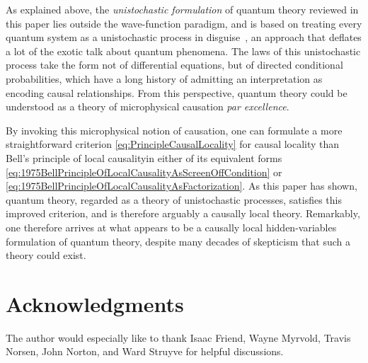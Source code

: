 \documentclass[12pt,english,prl,superscriptaddress,nobibnotes,nofootinbib]{revtex4-2}
\begin{document}
As explained above, the \emph{unistochastic formulation} of quantum
theory reviewed in this paper lies outside the wave-function paradigm,
and is based on treating every quantum system as a unistochastic process
in disguise~\citep{Barandes:2023tsqc,Barandes:2023tsqt}, an approach
that deflates a lot of the exotic talk about quantum phenomena. The
laws of this unistochastic process take the form not of differential
equations, but of directed conditional probabilities, which have a
long history of admitting an interpretation as encoding causal relationships.
From this perspective, quantum theory could be understood as a theory
of microphysical causation \emph{par excellence}.

By invoking this microphysical notion of causation, one can formulate
a more straightforward criterion \eqref{eq:PrincipleCausalLocality}
for causal locality than Bell's principle of local causality\textemdash in
either of its equivalent forms \eqref{eq:1975BellPrincipleOfLocalCausalityAsScreenOffCondition}
or \eqref{eq:1975BellPrincipleOfLocalCausalityAsFactorization}. As
this paper has shown, quantum theory, regarded as a theory of unistochastic
processes, satisfies this improved criterion, and is therefore arguably
a causally local theory. Remarkably, one therefore arrives at what
appears to be a causally local hidden-variables formulation of quantum
theory, despite many decades of skepticism that such a theory could
exist.

\section*{Acknowledgments}

The author would especially like to thank Isaac Friend, Wayne Myrvold,
Travis Norsen, John Norton, and Ward Struyve for helpful discussions.



\end{document}
